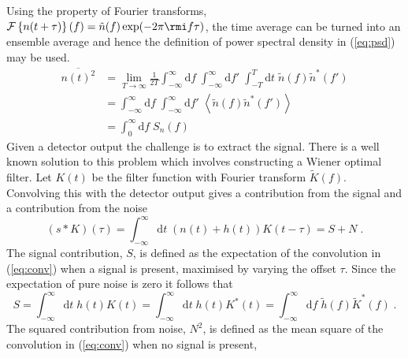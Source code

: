 Using the property of Fourier transforms, ${\cal{F}}\left\{ n(t+\tau) \right\}(f)=\tilde{n}(f)\exp (-2\pi \rmi f\tau )$, the time average can be turned into an ensemble average and hence the definition of power spectral density in (\ref{eq:psd}) may be used.
\begin{eqnarray}\label{eq:meansquare1}
\overline{n(t)^{2}}& = \lim_{T\rightarrow\infty}\frac{1}{2T}\int_{-\infty}^{\infty}\mathrm{d}f\;\int_{-\infty}^{\infty}\mathrm{d}f'\;\int_{-T}^{T}\mathrm{d}t\; \tilde{n}(f)\tilde{n}^{*}(f') \nonumber \\
&=\int_{-\infty}^{\infty}\mathrm{d}f\;\int_{-\infty}^{\infty}\mathrm{d}f'\;\left<\tilde{n}(f)\tilde{n}^{*}(f')\right>\nonumber \\
& = \int_{0}^{\infty}\mathrm{d}f\; S_{n}(f)
\end{eqnarray}
Given a detector output the challenge is to extract the signal. There is a well known solution to this problem which involves constructing a Wiener optimal filter. Let $K(t)$ be the filter function with Fourier transform $\tilde{K}(f)$.
Convolving this with the detector output gives a contribution from the signal and a contribution from the noise
\begin{equation}\label{eq:conv} \left(s*K\right)(\tau)=\int_{-\infty}^{\infty}\mathrm{d}t\;(n(t)+h(t))K(t-\tau)=S+N\; .\end{equation}
The signal contribution, $S$, is defined as the expectation of the convolution in (\ref{eq:conv}) when a signal is present, maximised by varying the offset $\tau$. Since the expectation of pure noise is zero it follows that
\begin{equation} S = \int_{-\infty}^{\infty}\mathrm{d}t\;h(t)K(t)=\int_{-\infty}^{\infty}\mathrm{d}t\;h(t)K^{*}(t)=\int_{-\infty}^{\infty}\mathrm{d}f\; \tilde{h}(f)\tilde{K}^{*}(f) \; .\end{equation}
The squared contribution from noise, $N^{2}$, is defined as the mean square of the convolution in (\ref{eq:conv}) when no signal is present,
